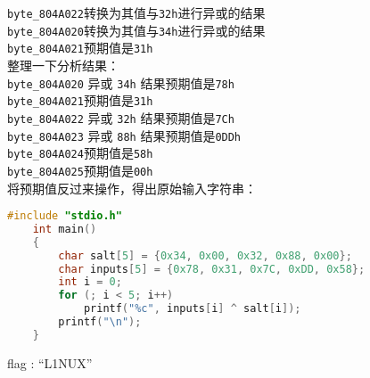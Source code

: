 \begin{enumerate}
	\lstinline$byte_804A022$转换为其值与\lstinline$32h$进行异或的结果\\
	\lstinline$byte_804A020$转换为其值与\lstinline$34h$进行异或的结果\\
	\lstinline$byte_804A021$预期值是\lstinline$31h$ \\
	整理一下分析结果：\\
	\lstinline$byte_804A020$ 异或 \lstinline$34h$ 结果预期值是\lstinline$78h$\\
	\lstinline$byte_804A021$预期值是\lstinline$31h$ \\
	\lstinline$byte_804A022$ 异或 \lstinline$32h$ 结果预期值是\lstinline$7Ch$\\
	\lstinline$byte_804A023$ 异或 \lstinline$88h$ 结果预期值是\lstinline$0DDh$\\
	\lstinline$byte_804A024$预期值是\lstinline$58h$ \\
	\lstinline$byte_804A025$预期值是\lstinline$00h$ \\
	将预期值反过来操作，得出原始输入字符串：\\
	\begin{lstlisting}[language=C]
	#include "stdio.h"
	int main()
	{
		char salt[5] = {0x34, 0x00, 0x32, 0x88, 0x00};
		char inputs[5] = {0x78, 0x31, 0x7C, 0xDD, 0x58};
		int i = 0;
		for (; i < 5; i++)
			printf("%c", inputs[i] ^ salt[i]);
		printf("\n");
	}
	\end{lstlisting}
	flag : ``L1NUX''
\end{enumerate}